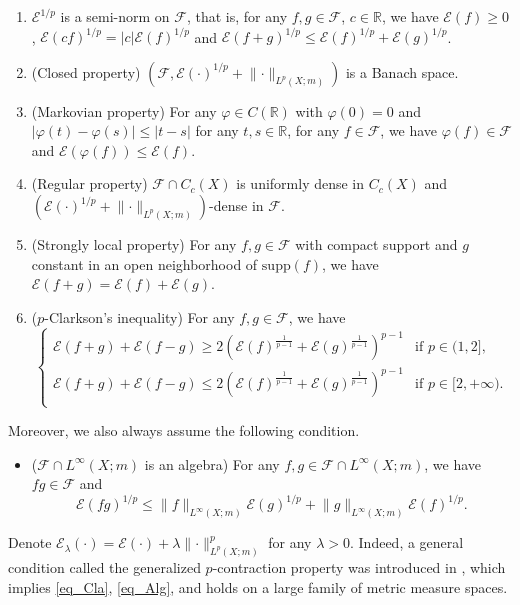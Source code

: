\documentclass[11pt,a4paper]{article}
\numberwithin{equation}{section}
\theoremstyle{plain}
\theoremstyle{definition}
\begin{document}
\begin{enumerate}[label=(\arabic*)]
\item $\mathcal{E}^{1/p}$ is a semi-norm on $\mathcal{F}$, that is, for any $f,g\in\mathcal{F}$, $c\in\mathbb{R}$, we have $\mathcal{E}(f)\ge0$, $\mathcal{E}(cf)^{1/p}=|c|\mathcal{E}(f)^{1/p}$ and $\mathcal{E}(f+g)^{1/p}\le\mathcal{E}(f)^{1/p}+\mathcal{E}(g)^{1/p}$.
\item (Closed property) $(\mathcal{F},\mathcal{E}(\cdot)^{1/p}+\lVert {\cdot}\rVert_{L^p(X;m)})$ is a Banach space.
\item (Markovian property) For any $\varphi\in C(\mathbb{R})$ with $\varphi(0)=0$ and $|\varphi(t)-\varphi(s)|\le|t-s|$ for any $t,s\in\mathbb{R}$, for any $f\in\mathcal{F}$, we have $\varphi(f)\in\mathcal{F}$ and $\mathcal{E}(\varphi(f))\le\mathcal{E}(f)$.
\item (Regular property) $\mathcal{F}\cap C_c(X)$ is uniformly dense in $C_c(X)$ and $(\mathcal{E}(\cdot)^{1/p}+\lVert {\cdot}\rVert_{L^p(X;m)})$-dense in $\mathcal{F}$.
\item (Strongly local property) For any $f,g\in\mathcal{F}$ with compact support and $g$ constant in an open neighborhood of $\mathrm{supp}(f)$, we have $\mathcal{E}(f+g)=\mathcal{E}(f)+\mathcal{E}(g)$.
\item ($p$-Clarkson's inequality) For any $f,g\in\mathcal{F}$, we have
\begin{equation*}\label{eq_Cla}\tag*{Cla}
\begin{cases}
\mathcal{E}(f+g)+\mathcal{E}(f-g)\ge2 \left(\mathcal{E}(f)^{\frac{1}{p-1}}+\mathcal{E}(g)^{\frac{1}{p-1}}\right)^{p-1}&\text{if }p\in(1,2],\\
\mathcal{E}(f+g)+\mathcal{E}(f-g)\le2 \left(\mathcal{E}(f)^{\frac{1}{p-1}}+\mathcal{E}(g)^{\frac{1}{p-1}}\right)^{p-1}&\text{if }p\in[2,+\infty).\\
\end{cases}
\end{equation*}
\end{enumerate}
Moreover, we also always assume the following condition.
\begin{itemize}
\item ($\mathcal{F}\cap L^\infty(X;m)$ is an algebra) For any $f,g\in\mathcal{F}\cap L^\infty(X;m)$, we have $fg\in\mathcal{F}$ and
\begin{equation*}\label{eq_Alg}\tag*{Alg}
\mathcal{E}(fg)^{{1}/{p}}\le \lVert f\rVert_{L^\infty(X;m)}\mathcal{E}(g)^{1/p}+\lVert g\rVert_{L^\infty(X;m)}\mathcal{E}(f)^{1/p}.
\end{equation*}
\end{itemize}
Denote $\mathcal{E}_\lambda(\cdot)=\mathcal{E}(\cdot)+\lambda \lVert {\cdot}\rVert^p_{L^p(X;m)}$ for any $\lambda>0$. Indeed, a general condition called the generalized $p$-contraction property was introduced in \cite{KS24a}, which implies \ref{eq_Cla}, \ref{eq_Alg}, and holds on a large family of metric measure spaces.
\end{document}
